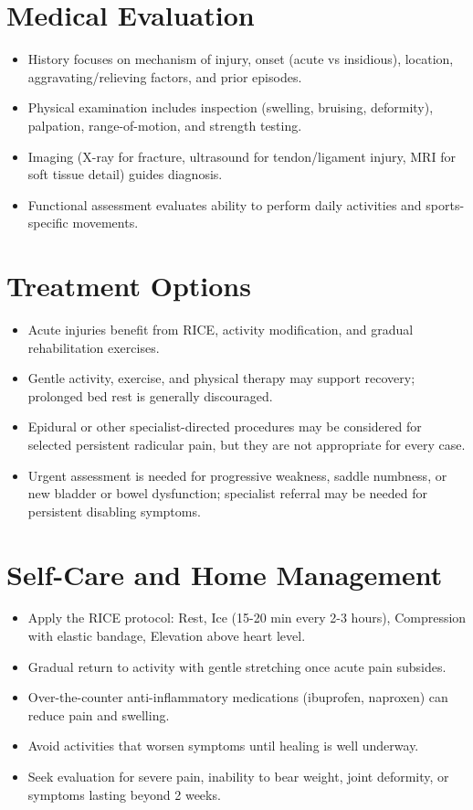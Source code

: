 \section*{Medical Evaluation}
\begin{itemize}
  \item History focuses on mechanism of injury, onset (acute vs insidious), location, aggravating/relieving factors, and prior episodes.
  \item Physical examination includes inspection (swelling, bruising, deformity), palpation, range-of-motion, and strength testing.
  \item Imaging (X-ray for fracture, ultrasound for tendon/ligament injury, MRI for soft tissue detail) guides diagnosis.
  \item Functional assessment evaluates ability to perform daily activities and sports-specific movements.
\end{itemize}

\section*{Treatment Options}
\begin{itemize}
  \item Acute injuries benefit from RICE, activity modification, and gradual rehabilitation exercises.
  \item Gentle activity, exercise, and physical therapy may support recovery; prolonged bed rest is generally discouraged.
  \item Epidural or other specialist-directed procedures may be considered for selected persistent radicular pain, but they are not appropriate for every case.
  \item Urgent assessment is needed for progressive weakness, saddle numbness, or new bladder or bowel dysfunction; specialist referral may be needed for persistent disabling symptoms.
\end{itemize}

\section*{Self-Care and Home Management}
\begin{itemize}
  \item Apply the RICE protocol: Rest, Ice (15-20 min every 2-3 hours), Compression with elastic bandage, Elevation above heart level.
  \item Gradual return to activity with gentle stretching once acute pain subsides.
  \item Over-the-counter anti-inflammatory medications (ibuprofen, naproxen) can reduce pain and swelling.
  \item Avoid activities that worsen symptoms until healing is well underway.
  \item Seek evaluation for severe pain, inability to bear weight, joint deformity, or symptoms lasting beyond 2 weeks.
\end{itemize}

